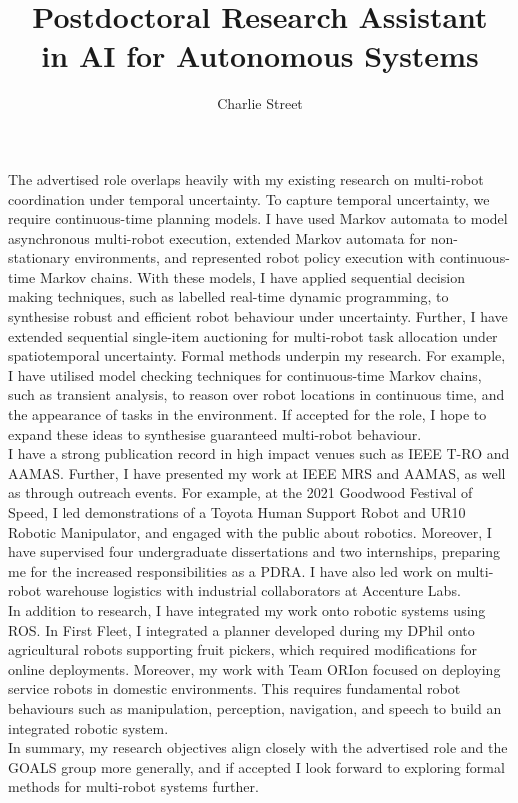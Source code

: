 \documentclass[12pt]{article}
\title{Postdoctoral Research Assistant \\in AI for Autonomous Systems}
\date{}
\author{Charlie Street}
\begin{document}
\maketitle
\thispagestyle{empty}

The advertised role overlaps heavily with my existing research on multi-robot coordination under temporal uncertainty.
%
To capture temporal uncertainty, we require continuous-time planning models.
%
I have used Markov automata to model asynchronous multi-robot execution, extended Markov automata for non-stationary environments, and represented robot policy execution with continuous-time Markov chains.
%
With these models, I have applied sequential decision making techniques, such as labelled real-time dynamic programming, to synthesise robust and efficient robot behaviour under uncertainty.
%
Further, I have extended sequential single-item auctioning for multi-robot task allocation under spatiotemporal uncertainty.
%
Formal methods underpin my research.
%
For example, I have utilised model checking techniques for continuous-time Markov chains, such as transient analysis, to reason over robot locations in continuous time, and the appearance of tasks in the environment.
%
If accepted for the role, I hope to expand these ideas to synthesise guaranteed multi-robot behaviour.\\

I have a strong publication record in high impact venues such as IEEE T-RO and AAMAS.
%
Further, I have presented my work at IEEE MRS and AAMAS, as well as through outreach events.
%
For example, at the 2021 Goodwood Festival of Speed, I led demonstrations of a Toyota Human Support Robot and UR10 Robotic Manipulator, and engaged with the public about robotics.
%
Moreover, I have supervised four undergraduate dissertations and two internships, preparing me for the increased responsibilities as a PDRA.
%
I have also led work on multi-robot warehouse logistics with industrial collaborators at Accenture Labs.\\

In addition to research, I have integrated my work onto robotic systems using ROS.
%
In First Fleet, I integrated a planner developed during my DPhil onto agricultural robots supporting fruit pickers, which required modifications for online deployments.
%
Moreover, my work with Team ORIon focused on deploying service robots in domestic environments.
%
This requires fundamental robot behaviours such as manipulation, perception, navigation, and speech to build an integrated robotic system.\\

In summary, my research objectives align closely with the advertised role and the GOALS group more generally, and if accepted I look forward to exploring formal methods for multi-robot systems further.
\end{document}
